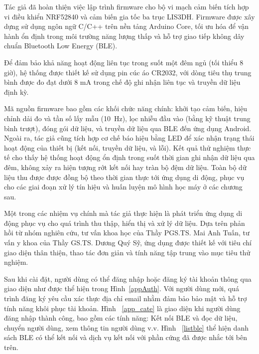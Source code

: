 Tác giả đã hoàn thiện việc lập trình firmware cho bộ vi mạch cảm biến 
tích hợp vi điều khiển NRF52840 và cảm biến gia tốc ba trục LIS3DH. 
Firmware được xây dựng sử dụng ngôn ngữ C/C++ trên nền tảng Arduino Core, 
tối ưu hóa để vận hành ổn định trong môi trường năng lượng thấp và 
hỗ trợ giao tiếp không dây chuẩn Bluetooth Low Energy (BLE).

Để đảm bảo khả năng hoạt động liên tục trong suốt một đêm ngủ 
(tối thiểu 8 giờ), hệ thống được thiết kế sử dụng pin cúc áo CR2032, 
với dòng tiêu thụ trung bình được đo đạt dưới 8 mA trong chế độ 
ghi nhận liên tục và truyền dữ liệu định kỳ.

Mã nguồn firmware bao gồm các khối chức năng chính: 
khởi tạo cảm biến, hiệu chỉnh dải đo và tần số lấy mẫu (10~Hz), 
lọc nhiễu đầu vào (bằng kỹ thuật trung bình trượt), 
đóng gói dữ liệu,
và truyền dữ liệu qua BLE đến ứng dụng Android. 
Ngoài ra, tác giả cũng tích hợp cơ chế báo hiệu bằng LED để xác nhận 
trạng thái hoạt động của thiết bị (kết nối, truyền dữ liệu, và lỗi).
Kết quả thử nghiệm thực tế cho thấy hệ thống hoạt động ổn định 
trong suốt thời gian ghi nhận dữ liệu qua đêm, không xảy ra hiện tượng 
rớt kết nối hay tràn bộ đệm dữ liệu. Toàn bộ dữ liệu thu được được đồng 
bộ theo thời gian thực tới ứng dụng di động, phục vụ cho các giai đoạn 
xử lý tín hiệu và huấn luyện mô hình học máy ở các chương sau.


Một trong các nhiệm vụ chính mà tác giả thực hiện là phát triển ứng dụng 
di động phục vụ cho quá trình thu thập, hiển thị và xử lý dữ liệu. 
Dựa trên phản hồi từ nhóm nghiên cứu, tư vấn khoa học của Thầy PGS.TS. Mai Anh Tuấn, tư vấn
y khoa của Thầy GS.TS. Dương Quý Sỹ,
ứng dụng được thiết kế với tiêu 
chí giao diện thân thiện, thao tác đơn giản và tính năng tập trung vào 
mục tiêu thử nghiệm.

Sau khi cài đặt, người dùng có thể đăng nhập hoặc đăng ký tài khoản 
thông qua giao diện như được thể hiện trong Hình~\ref{appAuth}. 
Với người dùng mới, quá trình đăng ký yêu cầu xác thực địa chỉ 
email nhằm đảm bảo bảo mật và hỗ trợ tính năng khôi phục tài khoản.
Hình ~\ref{app_cate} là giao diện khi người dùng đăng nhập thành công, 
bao gồm các tính năng: Kết nối BLE và đọc dữ liệu, chuyển người dùng, 
xem thông tin người dùng v.v.
Hình ~\ref{listble} thể hiện danh sách BLE có thể kết nối và 
dịch vụ kết nối với phần cứng đã được nhắc tới bên trên.


